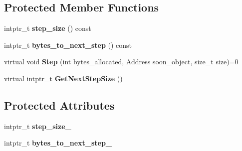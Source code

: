 \subsection*{Protected Member Functions}
\begin{DoxyCompactItemize}
\item 
intptr\+\_\+t {\bfseries step\+\_\+size} () const \hypertarget{classv8_1_1internal_1_1_allocation_observer_a2b39228326fc6f112821fd3bc9e3d368}{}\label{classv8_1_1internal_1_1_allocation_observer_a2b39228326fc6f112821fd3bc9e3d368}

\item 
intptr\+\_\+t {\bfseries bytes\+\_\+to\+\_\+next\+\_\+step} () const \hypertarget{classv8_1_1internal_1_1_allocation_observer_acd1e26bb58cf45790d605dbc96ea5dac}{}\label{classv8_1_1internal_1_1_allocation_observer_acd1e26bb58cf45790d605dbc96ea5dac}

\item 
virtual void {\bfseries Step} (int bytes\+\_\+allocated, Address soon\+\_\+object, size\+\_\+t size)=0\hypertarget{classv8_1_1internal_1_1_allocation_observer_a41118152d2c9a9834a486eccf08043a5}{}\label{classv8_1_1internal_1_1_allocation_observer_a41118152d2c9a9834a486eccf08043a5}

\item 
virtual intptr\+\_\+t {\bfseries Get\+Next\+Step\+Size} ()\hypertarget{classv8_1_1internal_1_1_allocation_observer_a91fb6ffe2d4b42ff7b4221dad89db465}{}\label{classv8_1_1internal_1_1_allocation_observer_a91fb6ffe2d4b42ff7b4221dad89db465}

\end{DoxyCompactItemize}
\subsection*{Protected Attributes}
\begin{DoxyCompactItemize}
\item 
intptr\+\_\+t {\bfseries step\+\_\+size\+\_\+}\hypertarget{classv8_1_1internal_1_1_allocation_observer_aca0c9295ca497a26f08cd8244f84d5aa}{}\label{classv8_1_1internal_1_1_allocation_observer_aca0c9295ca497a26f08cd8244f84d5aa}

\item 
intptr\+\_\+t {\bfseries bytes\+\_\+to\+\_\+next\+\_\+step\+\_\+}\hypertarget{classv8_1_1internal_1_1_allocation_observer_a5f02cbcbd88c5b87439c31ada838923e}{}\label{classv8_1_1internal_1_1_allocation_observer_a5f02cbcbd88c5b87439c31ada838923e}

\end{DoxyCompactItemize}

